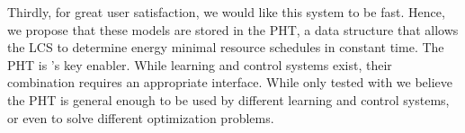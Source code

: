 Thirdly, for great user satisfaction, we would like this system to be fast. Hence, we propose that  these models are stored in the PHT, a data structure that allows the LCS to determine energy minimal resource schedules in constant time. The PHT is \SYSTEM{}'s key enabler.  While learning and control
systems exist, their combination requires an appropriate interface.
 While only tested with \SYSTEM{} we believe the PHT is general enough to be used by different learning and control systems, or even to solve different optimization problems.



